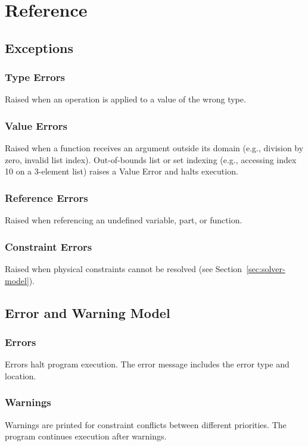 \part{Reference}
\chapter{Exceptions}

\section{Type Errors}
Raised when an operation is applied to a value of the wrong type.

\section{Value Errors}
Raised when a function receives an argument outside its domain (e.g., division by zero, invalid list index). Out-of-bounds list or set indexing (e.g., accessing index 10 on a 3-element list) raises a Value Error and halts execution.

\section{Reference Errors}
Raised when referencing an undefined variable, part, or function.

\section{Constraint Errors}
Raised when physical constraints cannot be resolved (see Section~\ref{sec:solver-model}).


\chapter{Error and Warning Model}

\section{Errors}
Errors halt program execution. The error message includes the error type and location.

\section{Warnings}
Warnings are printed for constraint conflicts between different priorities. The program continues execution after warnings.


